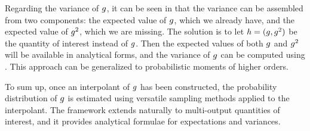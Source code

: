 Regarding the variance of $g$, it can be seen in  that the
variance can be assembled from two components: the expected value of $g$, which
we already have, and the expected value of $g^2$, which we are missing. The
solution is to let $h = (g, g^2)$ be the quantity of interest instead of $g$.
Then the expected values of both $g$ and $g^2$ will be available in analytical
forms, and the variance of $g$ can be computed using . This
approach can be generalized to probabilistic moments of higher orders.

To sum up, once an interpolant of $g$ has been constructed, the probability
distribution of $g$ is estimated using versatile sampling methods applied to
the interpolant. The framework extends naturally to multi-output quantities of
interest, and it provides analytical formulae for expectations and variances.
